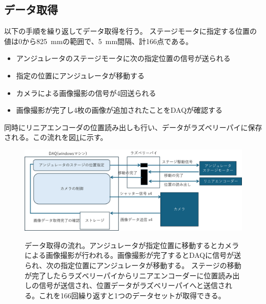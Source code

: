 \documentclass[a4paper,11pt,uplatex]{jsbook}
\begin{document}
\subsection{データ取得}\label{sec:DAQ}
以下の手順を繰り返してデータ取得を行う。
ステージモータに指定する位置の値は0から825~mmの範囲で、5~mm間隔、計166点である。
\begin{itemize}
  \item アンジュレータのステージモータに次の指定位置の信号が送られる
  \item 指定の位置にアンジュレータが移動する
  \item カメラによる画像撮影の信号が4回送られる
  \item 画像撮影が完了し4枚の画像が追加されたことをDAQが確認する
\end{itemize}
同時にリニアエンコーダの位置読み出しも行い、データがラズベリーパイに保存される。この流れを図\ref{DAQ}に示す。
\begin{figure}
  \centering
  \includegraphics[width=0.8\linewidth]{image/3-DAQ.png}\\
  \caption[データ取得の流れ]{データ取得の流れ。アンジュレータが指定位置に移動するとカメラによる画像撮影が行われる。画像撮影が完了するとDAQに信号が送られ、次の指定位置にアンジュレータが移動する。
  ステージの移動が完了したらラズベリーパイからリニアエンコーダーに位置読み出しの信号が送信され、位置データがラズベリーパイへと送信される。これを166回繰り返すと1つのデータセットが取得できる。}
  \label{DAQ}
\end{figure}
\end{document}
